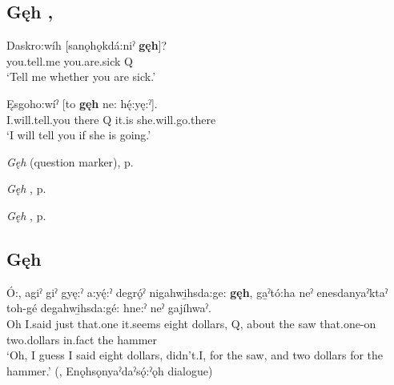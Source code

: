\subsection*{\textbf{Gęh} , } \label{p:[gęh] ‘whether’, ‘if’}

\ea
\label{ex:gpar51}
\gll Daskro:wíh [sanǫhǫkdá:niˀ \textbf{gęh}]?\\
you.tell.me you.are.sick Q\\
\glt ‘Tell me whether you are sick.’
\z


\ea
\label{ex:gpar52}
\gll Ęsgoho:wíˀ [to \textbf{gęh} ne: hę́:yę:ˀ].\\
I.will.tell.you there Q it.is she.will.go.there\\
\glt ‘I will tell you if she is going.’
\z


\begin{CayugaRelated}
\item \textit{Gęh}  (question marker), p. \pageref{p:[gęh] `Q’}\\
\item \textit{Gęh} , p. \pageref{p:[gęh] `didn’t I’}\\
\item \textit{Gęh} , p. \pageref{p:[gęh] ‘mind you’}
\end{CayugaRelated}



\subsection*{\textbf{Gęh} } \label{p:[gęh] `didn’t I’}

\ea
\label{ex:gpar53}
\gll Ó:, agiˀ giˀ gyę:ˀ a:yę́:ˀ degrǫ́ˀ nigahwi̱hsda:ge: \textbf{gęh}, ga̱ˀtó:ha neˀ enesdanyaˀktaˀ toh-gé degahwi̱hsda:gé: hne:ˀ neˀ gajíhwaˀ.\\
Oh I.said just that.one it.seems eight dollars, Q, about the saw that.one-on two.dollars in.fact the hammer\\
\glt ‘Oh, I guess I said eight dollars, didn’t.I, for the saw, and two dollars for the hammer.’ (\cite[159]{mithun_watewayestanih_1984}, Enǫhsǫnyaˀdaˀsǫ́:ˀǫh dialogue)
\z

